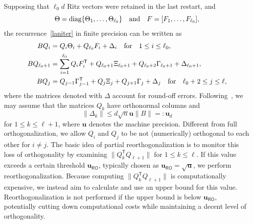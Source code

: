 \documentclass{siamart190516}
\newcommand{\Ttran}{\mathsf{T}}
\newcommand{\Ta}{\Xi}
\newcommand{\Tb}{\Gamma}
\newcommand{\mpr}{\mathbf{u}}
\providecommand{\diagm}{\mathrm{diag}}
\providecommand{\norm}[1]{\lVert#1\rVert}
\newcommand{\edit}[1]{\textcolor{black}{#1}} %
\begin{document}
Supposing that $\ell_{0}d$ Ritz vectors were retained in the last restart, and
\begin{equation*}
    \Theta=\diagm \{\Theta_{1},\dotsc,\Theta_{\ell_{0}}\}
    \quad\text{and}\quad 
    \edit{F=[F_{1},\dotsc,F_{\ell_{0}}]},
\end{equation*} 
the recurrence~\cref{laniter} in finite precision can be written as 
\begin{equation}
    \label{laniterfp}
    \begin{aligned}
        BQ_{i} &= Q_{i}\Theta_{i}+Q_{\ell_{0}}\edit{F_{i}}+\Delta_{i}\quad \text{for}\quad 1\leq i\leq \ell_{0},\\ 
        BQ_{\ell_{0}+1} &= \sum_{i=1}^{\ell_{0}}Q_{i}\edit{F_{i}^{\Ttran}}+Q_{\ell_{0}+1}\Ta_{\ell_{0}+1}+Q_{\ell_{0}+2}\edit{\Tb_{\ell_{0}+1}}+\Delta_{\ell_{0}+1},\\ 
        BQ_{j} &= Q_{j-1}\edit{\Tb_{j-1}^{\Ttran}}+Q_{j}\Ta_{j}+Q_{j+1}\edit{\Tb_{j}}+\Delta_{j}\quad \text{for}\quad \ell_{0}+2\leq j\leq \ell,        
    \end{aligned}
\end{equation}
where the matrices denoted with $\Delta$ account for round-off errors. Following~\cite{Grimes1994,Parlett1998}, we may assume that the matrices $Q_{k}$ have orthonormal columns and 
\begin{equation}
    \label{defmprd}
    \norm{\Delta_{k}}\leq d\sqrt{n}\mpr\norm{B}=: \mpr_{d}
\end{equation}
for $1\leq k\leq \ell+1$, where $\mpr$ denotes the machine precision.
Different from full orthogonalization, we allow $Q_{i}$ and $Q_{j}$ to be not (numerically) orthogonal to each other for $i\not=j$.
The basic idea of partial reorthogonalization is to monitor this loss of orthogonality by examining $\norm{Q_{k}^{\Ttran}Q_{\ell+1}}$ for $1 \leq k \leq \ell$. If this value exceeds a certain threshold $\mpr_{\mathsf{RO}}$, typically chosen as $\mpr_{\mathsf{RO}}=\sqrt{\mpr}$, we perform reorthogonalization. Because computing $\norm{Q_{k}^{\Ttran}Q_{\ell+1}}$ is computationally expensive, we instead aim to calculate and use an upper bound for this value. Reorthogonalization is not performed if the upper bound is below $\mpr_{\mathsf{RO}}$, potentially cutting down computational costs while maintaining a decent level of orthogonality. 
\end{document}
